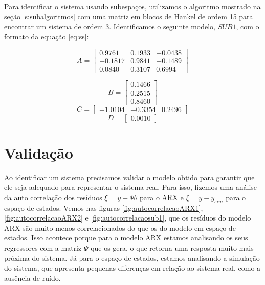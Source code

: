 Para identificar o sistema usando subespaços, utilizamos o algoritmo mostrado na seção \ref{s:subalgoritmos} com uma matriz em blocos de Hankel de ordem 15 para encontrar um sistema de ordem 3. Identificamos o seguinte modelo, $SUB1$, com o formato da equação \eqref{eq:ss}:

\begin{equation}
A=\begin{bmatrix}
0.9761  &  0.1933 &  -0.0438\\
-0.1817  &  0.9841  & -0.1489\\
0.0840  &  0.3107  &  0.6994
\end{bmatrix}
\end{equation}

\begin{equation}
B=\begin{bmatrix}
0.1466\\
0.2515\\
0.8460
\end{bmatrix}
\end{equation}
\begin{equation}
C=\begin{bmatrix}
-1.0104 &  -0.3354 &   0.2496
\end{bmatrix}
\end{equation}
\begin{equation}
D=\begin{bmatrix}
0.0010
\end{bmatrix}
\end{equation}

\section{Validação}\label{s4:val}
Ao identificar um sistema precisamos validar o modelo obtido para garantir que ele seja adequado para representar o sistema real. Para isso, fizemos uma análise da auto correlação dos resíduos $\xi=y-\Psi \hat{\theta}$ para o ARX e $\xi=y-y_{sim}$ para o espaço de estados. Vemos nas figuras \ref{fig:autocorrelacaoARX1}, \ref{fig:autocorrelacaoARX2} e \ref{fig:autocorrelacaosub1}, que os resíduos do modelo ARX são muito menos correlacionados do que os do modelo em espaço de estados. Isso acontece porque para o modelo ARX estamos analisando os seus regressores com a matriz $\Psi$ que os gera, o que retorna uma resposta muito mais próxima do sistema. Já para o espaço de estados, estamos analisando a simulação do sistema, que apresenta pequenas diferenças em relação ao sistema real, como a ausência de ruído.


